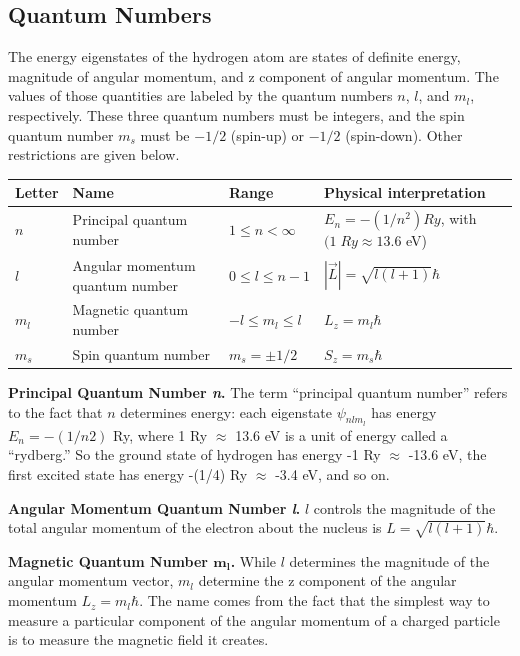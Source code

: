 \documentclass[../../../main.tex]{subfiles}
\begin{document}
\subsection{Quantum Numbers}
The energy eigenstates of the hydrogen atom are states of definite energy, magnitude of angular momentum, and z component of angular momentum. The values of those quantities are labeled by the quantum numbers $n$, $l$, and $m_l$, respectively. These three quantum numbers must be integers, and the spin quantum number $m_s$ must be $-1/2$ (spin-up) or $-1/2$ (spin-down). Other restrictions are given below.
\begin{center}
    \begin{tabular}{| p{} | p{} | p{} | p{}|}
        \hline
        Letter&Name&Range&Physical interpretation\\
        \hline
        $n$&Principal quantum number&$1 \leq n <\infty$&$E_n = -(1/n^2) Ry$, with $ (1 \;Ry \approx 13.6$ eV)\\
        $l$&Angular momentum quantum number&$0 \leq l \leq n - 1$ &$ |\overrightarrow{L}| = \sqrt{l(l + 1) }\hbar$\\
        $m_l$&Magnetic quantum number&$-l \leq m_l \leq l$&$L_z = m_l\hbar$\\
        $m_s$&Spin quantum number&$m_s = \pm 1/2$&$S_z = m_s\hbar$\\\hline
    \end{tabular}
\end{center}

\textbf{Principal Quantum Number \emph{n}.} The term “principal quantum number” refers to the fact that $n$ determines energy: each eigenstate $\psi_{nlm_l}$  has energy $E_n = -(1/n2)$ Ry, where 1 Ry $\approx$ 13.6 eV is a unit of energy called a “rydberg.” So the ground state of hydrogen has energy -1 Ry $\approx$ -13.6 eV, the first excited state has energy -(1/4) Ry $\approx$ -3.4 eV, and so on.

\textbf{Angular Momentum Quantum Number \emph{l}.} $l$ controls the magnitude of the total angular momentum of the electron about the nucleus is $L = \sqrt{l(l + 1)} \hbar$.

\textbf{Magnetic Quantum Number $\boldsymbol{m_l}$.}  While $l$ determines the magnitude of the angular momentum vector, $m_l$ determine the z component of the angular momentum $L_z = m_l \hbar$. The name comes from the fact that the simplest way to measure a particular component of the angular momentum of a charged particle is to measure the magnetic field it creates.
\end{document}
